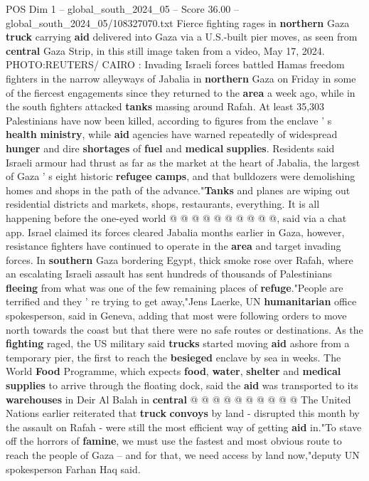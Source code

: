 \begin{textsample}{POS Dim 1 – global\_south\_2024\_05 – Score 36.00 – global\_south\_2024\_05/108327070.txt}  \label{ex:f1_pos_076}
Fierce fighting rages in \textbf{northern} Gaza \textbf{truck} carrying \textbf{aid} delivered into Gaza via a U.S.-built pier moves, as seen from \textbf{central} Gaza Strip, in this still image taken from a video, May 17, 2024.
PHOTO:REUTERS/ CAIRO : Invading Israeli forces battled Hamas freedom fighters in the narrow alleyways of Jabalia in \textbf{northern} Gaza on Friday in some of the fiercest engagements since they returned to the \textbf{area} a week ago, while in the south fighters attacked \textbf{tanks} massing around Rafah.
At least 35,303 Palestinians have now been killed, according to figures from the enclave ' s \textbf{health} \textbf{ministry}, while \textbf{aid} agencies have warned repeatedly of widespread \textbf{hunger} and dire \textbf{shortages} of \textbf{fuel} and \textbf{medical} \textbf{supplies}.
Residents said Israeli armour had thrust as far as the market at the heart of Jabalia, the largest of Gaza ' s eight historic \textbf{refugee} \textbf{camps}, and that bulldozers were demolishing homes and shops in the path of the advance."\textbf{Tanks} and planes are wiping out residential districts and markets, shops, restaurants, everything.
It is all happening before the one-eyed world @ @ @ @ @ @ @ @ @ @, said via a chat app.
Israel claimed its forces cleared Jabalia months earlier in Gaza, however, resistance fighters have continued to operate in the \textbf{area} and target invading forces.
In \textbf{southern} Gaza bordering Egypt, thick smoke rose over Rafah, where an escalating Israeli assault has sent hundreds of thousands of Palestinians \textbf{fleeing} from what was one of the few remaining places of \textbf{refuge}."People are terrified and they ' re trying to get away,"Jens Laerke, UN \textbf{humanitarian} office spokesperson, said in Geneva, adding that most were following orders to move north towards the coast but that there were no safe routes or destinations.
As the \textbf{fighting} raged, the US military said \textbf{trucks} started moving \textbf{aid} ashore from a temporary pier, the first to reach the \textbf{besieged} enclave by sea in weeks.
The World \textbf{Food} Programme, which expects \textbf{food}, \textbf{water}, \textbf{shelter} and \textbf{medical} \textbf{supplies} to arrive through the floating dock, said the \textbf{aid} was transported to its \textbf{warehouses} in Deir Al Balah in \textbf{central} @ @ @ @ @ @ @ @ @ @ The United Nations earlier reiterated that \textbf{truck} \textbf{convoys} by land - disrupted this month by the assault on Rafah - were still the most efficient way of getting \textbf{aid} in."To stave off the horrors of \textbf{famine}, we must use the fastest and most obvious route to reach the people of Gaza -- and for that, we need access by land now,"deputy UN spokesperson Farhan Haq said.

\end{textsample}

